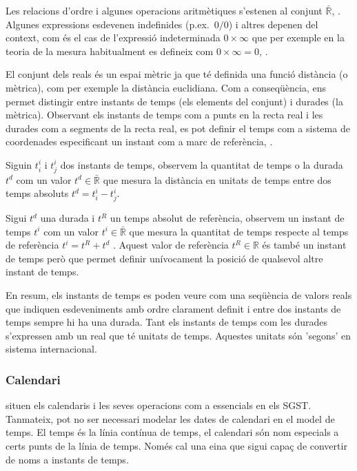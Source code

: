 Les relacions d'ordre i algunes operacions aritmètiques s'estenen al
conjunt $\bar{\mathbb{R}}$, \cite{cantrell:extendedreal}.  Algunes
expressions esdevenen indefinides (p.ex.\ $0/0$) i altres depenen del
context, com és el cas de l'expressió indeterminada $0 \times \infty$ que
per exemple en la teoria de la mesura habitualment es defineix com $0 \times
\infty = 0$, \cite{wiki:extendedreal}.


El conjunt dels reals és un espai mètric ja que té definida una funció
distància (o mètrica), com per exemple la distància euclidiana. Com a
conseqüència, ens permet distingir entre instants de temps (els
elements del conjunt) i durades (la mètrica). Observant els instants
de temps com a punts en la recta real i les durades com a segments de
la recta real, es pot definir el temps com a sistema de coordenades
especificant un instant com a marc de
referència, \parencite{iep:time-supplement,wiki:coordinate}.


\begin{definition}[Temps]
  \label{def:model:temps}
  Siguin $t^i_i$ i $t^i_j$ dos instants de temps, observem la quantitat
  de temps o la durada $t^d$ com un valor $t^d \in\bar{\mathbb{R}}$
  que mesura la distància en unitats de temps entre dos temps
  absoluts $t^d = t^i_i - t^i_j$.
  
  Sigui $t^d$ una durada i $t^{R}$ un temps absolut de referència,
  observem un instant de temps $t^i$ com un valor $t^i
  \in\bar{\mathbb{R}}$ que mesura la quantitat de temps respecte al
  temps de referència $t^i= t^{R} + t^d$ . Aquest valor de referència
  $t^{R}\in\mathbb{R}$ és també un instant de temps però que permet
  definir unívocament la posició de qualsevol altre instant de temps.


\end{definition}

En resum, els instants de temps es poden veure com una seqüència de
valors reals que indiquen esdeveniments amb ordre clarament definit i
entre dos instants de temps sempre hi ha una durada. Tant els instants
de temps com les durades s'expressen amb un real que té unitats de
temps. Aquestes unitats són 'segons' en sistema internacional.



\subsubsection{Calendari}
\textcite{dreyer94} situen els calendaris i les seves operacions com a
essencials en els SGST. Tanmateix, pot no ser necessari modelar les
dates de calendari en el model de temps. El temps és la línia contínua
de temps, el calendari són nom especials a certs punts de la línia de
temps. Només cal una eina que sigui capaç de convertir de noms a
instants de temps.


